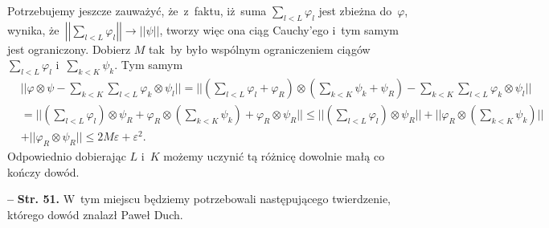 \documentclass[a4paper,11pt]{article}
\newcommand{\spaceFour}{0.5em}
\newcommand{\ra}{\rightarrow}
\newcommand{\veps}{\varepsilon}
\newcommand{\vp}{\varphi}
\newcommand{\ot}{\otimes}
\newcommand{\Sum}{\sum\limits}
\newcommand{\norm}[1]{\left|\left| #1 \right|\right|}
\newcommand{\tb}{\textbf}
\newcommand{\noi}{\noindent}
\newcommand{\start}{\noi \tb{--} {}}
\newcommand{\Str}[1]{\tb{Str. #1.}}
\begin{document}
Potrzebujemy jeszcze zauważyć, że~z~faktu, iż~suma
$\sum_{ l < L } \vp_{ l }$ jest zbieżna do~$\vp$, wynika,
że~$\norm{ \sum_{ l < L } \vp_{ l } } \ra \norm{ \psi }$, tworzy więc
ona ciąg Cauchy'ego i~tym samym jest ograniczony.
Dobierz %
$M$ tak~by było wspólnym ograniczeniem ciągów
$\sum_{ l < L } \vp_{ l }$ i~$\sum_{ k < K } \psi_{ k }$. Tym samym
\begin{equation*}
  \begin{split}
    & || \vp \ot \psi - \Sum_{ k < K }\Sum_{ l < L } \vp_{ k } \ot
    \psi_{ l } || = || ( \Sum_{ l < L } \vp_{ l } + \vp_{ R } ) \ot (
    \Sum_{ k < K } \psi_{ k } + \psi_{ R } )
    - \Sum_{ k < K }\Sum_{ l < L } \vp_{ k } \ot \psi_{ l } || \\
    &= || ( \Sum_{ l < L } \vp_{ l } ) \ot \psi_{ R } + \vp_{ R } \ot
    ( \Sum_{ k < K } \psi_{ k } ) + \vp_{ R } \ot \psi_{ R } || \leq
    || ( \Sum_{ l < L } \vp_{ l } ) \ot \psi_{ R } ||
    + || \vp_{ R } \ot ( \Sum_{ k < K } \psi_{ k } ) || \\
    &+ || \vp_{ R } \ot \psi_{ R } || \leq 2 M \veps + \veps^{ 2 }.
  \end{split}
\end{equation*}
Odpowiednio dobierając $L$ i~$K$ możemy uczynić tą różnicę dowolnie
małą co kończy dowód.

\vspace{\spaceFour}


\start \Str{51} W~tym miejscu będziemy potrzebowali następującego
twierdzenie, którego dowód znalazł Paweł Duch.
\end{document}
